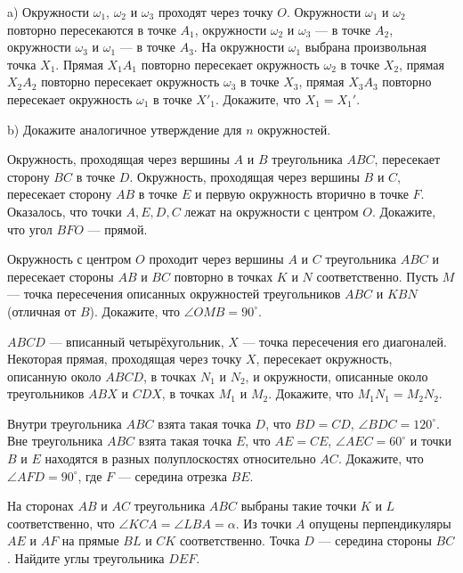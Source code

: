 \documentclass{article}
\begin{document}
\begin{enumerate_boxed}
        \item a) Окружности $\omega_1$, $\omega_2$ и $\omega_3$ проходят через точку $O$.
        Окружности $\omega_1$ и $\omega_2$ повторно пересекаются в точке $A_1$, окружности $\omega_2$ и $\omega_3$ — в точке $A_2$, окружности $\omega_3$ и $\omega_1$ — в точке $A_3$.
        На окружности $\omega_1$ выбрана произвольная точка $X_1$.
        Прямая $X_{1}A_1$ повторно пересекает окружность $\omega_2$ в точке $X_2$, прямая $X_{2}A_2$ повторно пересекает окружность $\omega_3$ в точке $X_3$, прямая $X_{3}A_3$ повторно пересекает окружность $\omega_1$ в точке $X'_1$.
        Докажите, что $X_1=X_1'$.

        b) Докажите аналогичное утверждение для $n$ окружностей.

        \item Окружность, проходящая через вершины $A$ и $B$ треугольника $ABC$, пересекает сторону $BC$ в точке $D$.
        Окружность, проходящая через вершины $B$ и $C$, пересекает сторону $AB$ в точке $E$ и первую окружность вторично в точке $F$.
        Оказалось, что точки $A, E, D, C$ лежат на окружности с центром $O$.
        Докажите, что угол $BFO$ — прямой.

        \item Окружность с центром $O$ проходит через вершины $A$ и $C$ треугольника $ABC$ и пересекает стороны $AB$ и $BC$ повторно в точках $K$ и $N$ соответственно.
        Пусть $M$ — точка пересечения описанных окружностей треугольников $ABC$ и $KBN$ (отличная от $B$). Докажите, что $\angle OMB=90^\circ$.

        \item $ABCD$  — вписанный четырёхугольник, $X$ — точка пересечения его диагоналей.
        Некоторая прямая, проходящая через точку $X$, пересекает окружность, описанную около $ABCD$, в точках $N_1$ и $N_2$, и окружности, описанные около треугольников $ABX$ и $CDX$, в точках $M_1$ и $M_2$.
        Докажите, что $M_{1}N_1=M_{2}N_2$.

        \item Внутри треугольника $ABC$ взята такая точка $D$, что $BD=CD$, $\angle BDC=120^\circ$.
        Вне треугольника $ABC$ взята такая точка $E$, что $AE=CE$, $\angle AEC=60^\circ$ и точки $B$ и $E$ находятся в разных полуплоскостях относительно $AC$.
        Докажите, что $\angle AFD=90^\circ$, где $F$ — середина отрезка $BE$.

        \item На сторонах $AB$ и $AC$ треугольника $ABC$ выбраны такие точки $K$ и $L$ соответственно, что $\angle KCA=\angle LBA=\alpha$.
        Из точки $A$ опущены перпендикуляры $AE$ и $AF$ на прямые $BL$ и $CK$ соответственно.
        Точка $D$ — середина стороны $BC$.
        Найдите углы треугольника $DEF$.


\end{enumerate_boxed}
\end{document}
